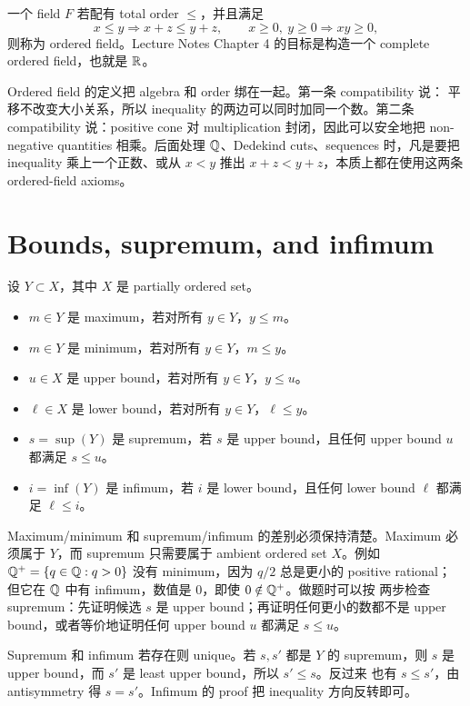 \begin{definition}
一个 field \(F\) 若配有 total order \(\leq\)，并且满足
\[
  x\leq y\Rightarrow x+z\leq y+z,
  \qquad
  x\geq0,\ y\geq0\Rightarrow xy\geq0,
\]
则称为 ordered field。Lecture Notes Chapter 4 的目标是构造一个 complete
ordered field，也就是 \(\mathbb{R}\)。
\end{definition}

Ordered field 的定义把 algebra 和 order 绑在一起。第一条 compatibility 说：
平移不改变大小关系，所以 inequality 的两边可以同时加同一个数。第二条 compatibility
说：positive cone 对 multiplication 封闭，因此可以安全地把 non-negative
quantities 相乘。后面处理 \(\mathbb{Q}\)、Dedekind cuts、sequences 时，凡是要把
inequality 乘上一个正数、或从 \(x<y\) 推出 \(x+z<y+z\)，本质上都在使用这两条
ordered-field axioms。

\section{Bounds, supremum, and infimum}

设 \(Y\subset X\)，其中 \(X\) 是 partially ordered set。
\begin{itemize}
  \item \(m\in Y\) 是 maximum，若对所有 \(y\in Y\)，\(y\leq m\)。
  \item \(m\in Y\) 是 minimum，若对所有 \(y\in Y\)，\(m\leq y\)。
  \item \(u\in X\) 是 upper bound，若对所有 \(y\in Y\)，\(y\leq u\)。
  \item \(\ell\in X\) 是 lower bound，若对所有 \(y\in Y\)，\(\ell\leq y\)。
  \item \(s=\sup(Y)\) 是 supremum，若 \(s\) 是 upper bound，且任何 upper bound
  \(u\) 都满足 \(s\leq u\)。
  \item \(i=\inf(Y)\) 是 infimum，若 \(i\) 是 lower bound，且任何 lower bound
  \(\ell\) 都满足 \(\ell\leq i\)。
\end{itemize}

Maximum/minimum 和 supremum/infimum 的差别必须保持清楚。Maximum 必须属于
\(Y\)，而 supremum 只需要属于 ambient ordered set \(X\)。例如
\(\mathbb{Q}^+=\{q\in\mathbb{Q}:q>0\}\) 没有 minimum，因为 \(q/2\) 总是更小的 positive rational；
但它在 \(\mathbb{Q}\) 中有 infimum，数值是 \(0\)，即使 \(0\notin\mathbb{Q}^+\)。做题时可以按
两步检查 supremum：先证明候选 \(s\) 是 upper bound；再证明任何更小的数都不是
upper bound，或者等价地证明任何 upper bound \(u\) 都满足 \(s\leq u\)。

Supremum 和 infimum 若存在则 unique。若 \(s,s'\) 都是 \(Y\) 的 supremum，则
\(s\) 是 upper bound，而 \(s'\) 是 least upper bound，所以 \(s'\leq s\)。反过来
也有 \(s\leq s'\)，由 antisymmetry 得 \(s=s'\)。Infimum 的 proof 把 inequality
方向反转即可。

